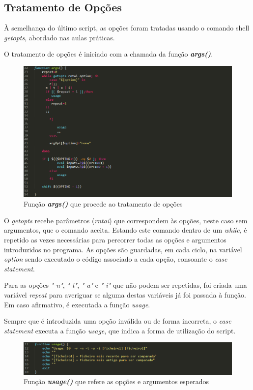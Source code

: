 \documentclass[10pt,portuguese]{article}
\begin{document}
\subsection{Tratamento de Opções}
À semelhança do último script, as opções foram tratadas usando o comando shell \textit{getopts}, abordado nas aulas práticas.
\newline
\par O tratamento de opções é iniciado com a chamada da função \textbf{\textit{args()}}.
\begin{figure}[!h]
    \centering
    \includegraphics[width=\textwidth]{comparestats/getopts_c.png}
    \caption{Função \textbf{\textit{args()}} que procede ao tratamento de opções}
\end{figure}
\par O \textit{getopts} recebe parâmetros (\textit{rntai}) que correspondem às opções, neste caso sem argumentos, que o comando aceita. Estando este comando dentro de um \textit{while}, é repetido as vezes necessárias para percorrer todas as opções e argumentos introduzidos no programa. As opções são guardadas, em cada ciclo, na variável \textit{option} sendo executado o código associado a cada opção, consoante o \textit{case statement}.
\par Para as opções \textit{"-n"}, \textit{"-t"}, \textit{"-a"} e \textit{"-i"} que não podem ser repetidas, foi criada uma variável \textit{repeat} para averiguar se alguma destas variáveis já foi passada à função. Em caso afirmativo, é executada a função \textit{usage}.
\par Sempre que é introduzida uma opção inválida ou de forma incorreta, o \textit{case statement} executa a função \textit{usage}, que indica a forma de utilização do script.
\begin{figure}[!h]
    \centering
    \includegraphics[width=\textwidth]{comparestats/usage_c.png}
    \caption{Função \textbf{\textit{usage()}} que refere as opções e argumentos esperados}
\end{figure}
\end{document}
